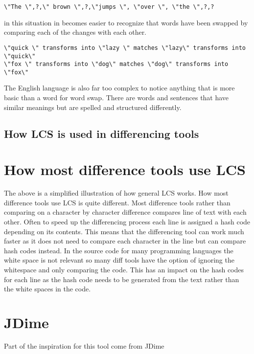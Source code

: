 \begin{verbatim}
\"The \",?,\" brown \",?,\"jumps \", \"over \", \"the \",?,?
\end{verbatim}

in this situation in becomes easier to recognize that words have been swapped by comparing each of the changes with each other.  

\begin{verbatim}
\"quick \" transforms into \"lazy \" matches \"lazy\" transforms into \"quick\"
\"fox \" transforms into \"dog\" matches \"dog\" transforms into \"fox\" 
\end{verbatim}

The English language is also far too complex to notice anything that is more basic than a word for word swap.
There are words and sentences that have similar meanings but are spelled and structured differently.

\subsection{How LCS is used in differencing tools}
\section{How most difference tools use LCS}
The above is a simplified illustration of how general LCS works.
How most difference tools use LCS is quite different.
Most difference tools rather than comparing on a character by character difference compares line of text with each other.
Often to speed up the differencing process each line is assigned a hash code depending on its contents. 
This means that the differencing tool can work much faster as it does not need to compare each character in the line but can compare hash codes instead.
In the source code for many programming languages the white space is not relevant so many diff tools have the option of ignoring the whitespace and only comparing the code.
This has an impact on the hash codes for each line as the hash code needs to be generated from the text rather than the white spaces in the code.
% 
 
 



\section{JDime}
Part of the inspiration for this tool come from JDime



